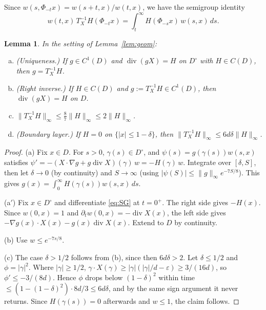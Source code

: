 \documentclass[11pt]{article}
\newtheorem{lemma}[theorem]{Lemma}
\theoremstyle{definition}
\theoremstyle{remark}
\newcommand{\dv}{\operatorname{div}}
\newcommand{\Dint}{D^{\circ}}
\begin{document}
Since $w(s,\Phi_{-t}x)=w(s+t,x)/w(t,x)$, we have the semigroup identity
\begin{equation}\label{eq:SG}
w(t,x)\,T^{-1}_XH(\Phi_{-t}x)=\int_t^\infty H(\Phi_{-s}x)\,w(s,x)\,ds .
\end{equation}

\begin{lemma}\label{lem:T}
In the setting of Lemma~\ref{lem:geom}:
\begin{enumerate}[(a)]
\item[\textup{(a)}] \textup{(Uniqueness.)} If $g\in C^1(D)$ and $\dv(gX)=H$ on $\Dint$ with $H\in C(D)$, then $g=T^{-1}_XH$.
\item[\textup{(a$'$)}] \textup{(Right inverse.)} If $H\in C(D)$ and $g:=T^{-1}_XH\in C^1(D)$, then $\dv(gX)=H$ on $D$.
\item[\textup{(b)}] $\|T^{-1}_XH\|_\infty\le\frac87\|H\|_\infty\le2\|H\|_\infty$.
\item[\textup{(c)}] \textup{(Boundary layer.)} If $H=0$ on $\{|x|\le1-\delta\}$, then $\|T^{-1}_XH\|_\infty\le6d\delta\|H\|_\infty$.
\end{enumerate}
\end{lemma}
\begin{proof}
(a) Fix $x\in D$. For $s>0$, $\gamma(s)\in\Dint$, and $\psi(s)=g(\gamma(s))w(s,x)$ satisfies
$\psi'=-(X\cdot\nabla g+g\dv X)(\gamma)\,w=-H(\gamma)\,w$.
Integrate over $[\delta,S]$, then let $\delta\to0$ (by continuity) and $S\to\infty$ (using $|\psi(S)|\le\|g\|_\infty e^{-7S/8}$). This gives $g(x)=\int_0^\infty H(\gamma(s))w(s,x)\,ds$.

(a$'$) Fix $x\in\Dint$ and differentiate \eqref{eq:SG} at $t=0^+$. The right side gives $-H(x)$. Since $w(0,x)=1$ and $\partial_tw(0,x)=-\dv X(x)$, the left side gives $-\nabla g(x)\cdot X(x)-g(x)\dv X(x)$. Extend to $D$ by continuity.

(b) Use $w\le e^{-7s/8}$.

(c) The case $\delta>1/2$ follows from (b), since then $6d\delta>2$. Let $\delta\le1/2$ and $\phi=|\gamma|^2$. Where $|\gamma|\ge1/2$, $\gamma\cdot X(\gamma)\ge|\gamma|(|\gamma|/d-\varepsilon)\ge3/(16d)$, so $\phi'\le-3/(8d)$. Hence $\phi$ drops below $(1-\delta)^2$ within time $\le(1-(1-\delta)^2)\cdot8d/3\le6d\delta$, and by the same sign argument it never returns. Since $H(\gamma(s))=0$ afterwards and $w\le1$, the claim follows.
\end{proof}
\end{document}
